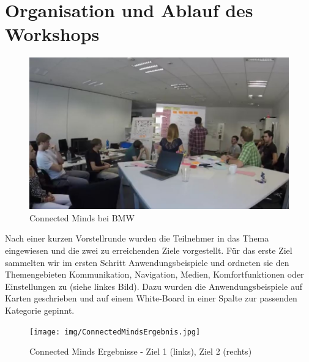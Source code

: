 \section[Ablauf]{Organisation und Ablauf des Workshops}
\begin{figure}[ht]
  \centering
  \includegraphics[width=1\textwidth]{img/ConnectedMind.jpg}
  \caption{Connected Minds bei BMW}
  \label{fig:ConnectedMind}
\end{figure} 
Nach einer kurzen Vorstellrunde wurden die Teilnehmer in das Thema eingewiesen und die zwei zu erreichenden Ziele vorgestellt. 
Für das erste Ziel sammelten wir im ersten Schritt Anwendungsbeispiele und ordneten sie den Themengebieten Kommunikation, Navigation, Medien, Komfortfunktionen oder Einstellungen zu (siehe  linkes Bild). Dazu wurden die Anwendungsbeispiele auf Karten geschrieben und auf einem White-Board in einer Spalte zur passenden Kategorie gepinnt.
\begin{figure}[ht]
  \centering
  \texttt{[image: img/ConnectedMindsErgebnis.jpg]}
  \caption[Connected Minds Ergebnisse]{Connected Minds Ergebnisse - Ziel 1 (links), Ziel 2 (rechts)}
  \label{fig:ConnectedMindErgebnisse}
\end{figure}  

